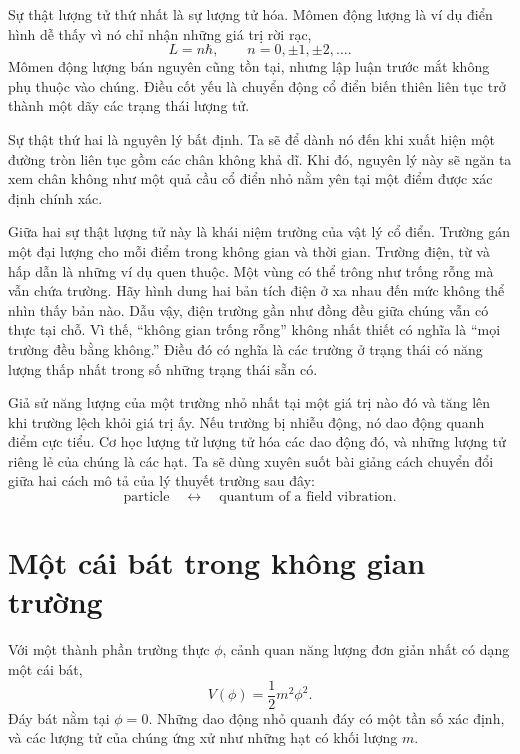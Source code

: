 Sự thật lượng tử thứ nhất là sự lượng tử hóa. Mômen động lượng là ví dụ điển hình dễ thấy vì nó chỉ nhận những giá trị rời rạc,
\begin{equation}
L=n\hbar,
\qquad
n=0,\pm1,\pm2,\ldots .
\end{equation}
Mômen động lượng bán nguyên cũng tồn tại, nhưng lập luận trước mắt không phụ thuộc vào chúng. Điều cốt yếu là chuyển động cổ điển biến thiên liên tục trở thành một dãy các trạng thái lượng tử.

Sự thật thứ hai là nguyên lý bất định. Ta sẽ để dành nó đến khi xuất hiện một đường tròn liên tục gồm các chân không khả dĩ. Khi đó, nguyên lý này sẽ ngăn ta xem chân không như một quả cầu cổ điển nhỏ nằm yên tại một điểm được xác định chính xác.

Giữa hai sự thật lượng tử này là khái niệm trường của vật lý cổ điển. Trường gán một đại lượng cho mỗi điểm trong không gian và thời gian. Trường điện, từ và hấp dẫn là những ví dụ quen thuộc. Một vùng có thể trông như trống rỗng mà vẫn chứa trường. Hãy hình dung hai bản tích điện ở xa nhau đến mức không thể nhìn thấy bản nào. Dẫu vậy, điện trường gần như đồng đều giữa chúng vẫn có thực tại chỗ. Vì thế, ``không gian trống rỗng'' không nhất thiết có nghĩa là ``mọi trường đều bằng không.'' Điều đó có nghĩa là các trường ở trạng thái có năng lượng thấp nhất trong số những trạng thái sẵn có.

Giả sử năng lượng của một trường nhỏ nhất tại một giá trị nào đó và tăng lên khi trường lệch khỏi giá trị ấy. Nếu trường bị nhiễu động, nó dao động quanh điểm cực tiểu. Cơ học lượng tử lượng tử hóa các dao động đó, và những lượng tử riêng lẻ của chúng là các hạt. Ta sẽ dùng xuyên suốt bài giảng cách chuyển đổi giữa hai cách mô tả của lý thuyết trường sau đây:
\begin{equation}
\text{particle}
\quad\longleftrightarrow\quad
\text{quantum of a field vibration}.
\end{equation}

\section{Một cái bát trong không gian trường}

Với một thành phần trường thực $\phi$, cảnh quan năng lượng đơn giản nhất có dạng một cái bát,
\begin{equation}
V(\phi)=\frac{1}{2}m^{2}\phi^{2}.
\end{equation}
Đáy bát nằm tại $\phi=0$. Những dao động nhỏ quanh đáy có một tần số xác định, và các lượng tử của chúng ứng xử như những hạt có khối lượng $m$.

